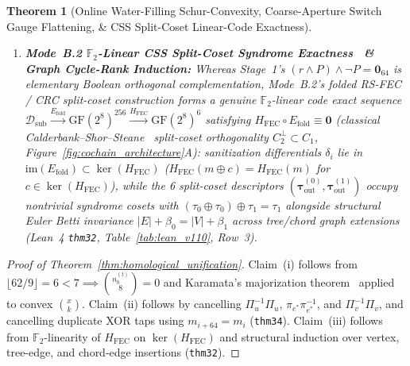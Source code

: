 \documentclass[10pt,twocolumn]{article}
\theoremstyle{spectralthm}
\newtheorem{theorem}{Theorem}[section]
\begin{document}
\begin{theorem}[Online Water-Filling Schur-Convexity, Coarse-Aperture Switch Gauge Flattening, \& CSS Split-Coset Linear-Code Exactness]
\begin{enumerate}
  \item[(iii)] \textbf{Mode~B.2 $\mathbb{F}_2$-Linear CSS Split-Coset Syndrome Exactness~\cite{calderbank1996good} \& Graph Cycle-Rank Induction:} Whereas Stage~1's $(r \wedge P) \wedge \neg P = \mathbf{0}_{64}$ is elementary Boolean orthogonal complementation, Mode~B.2's folded RS-FEC / CRC split-coset construction forms a genuine $\mathbb{F}_2$-linear code exact sequence $\mathcal{D}_{\mathrm{sub}} \xrightarrow{E_{\mathrm{fold}}} \mathrm{GF}(2^8)^{256} \xrightarrow{H_{\mathrm{FEC}}} \mathrm{GF}(2^8)^6$ satisfying $H_{\mathrm{FEC}} \circ E_{\mathrm{fold}} \equiv \mathbf{0}$ (classical Calderbank--Shor--Steane~\cite{calderbank1996good} split-coset orthogonality $C_2^\perp \subset C_1$, Figure~\ref{fig:cochain_architecture}A): sanitization differentials $\delta_i$ lie in $\mathrm{im}(E_{\mathrm{fold}}) \subset \ker(H_{\mathrm{FEC}})$ ($H_{\mathrm{FEC}}(m \oplus c) = H_{\mathrm{FEC}}(m)$ for $c \in \ker(H_{\mathrm{FEC}})$), while the 6 split-coset descriptors $(\boldsymbol{\tau}_{\mathrm{out}}^{(0)}, \boldsymbol{\tau}_{\mathrm{out}}^{(1)})$ occupy nontrivial syndrome cosets with $(\tau_0 \oplus \tau_0) \oplus \tau_1 = \tau_1$ alongside structural Euler Betti invariance $|E| + \beta_0 = |V| + \beta_1$ across tree/chord graph extensions~\cite{tutte1961problem,nashwilliams1961edge,tarjan1983data} (Lean~4 \texttt{thm32}, Table~\ref{tab:lean_v110}, Row~3).
\end{enumerate}
\end{theorem}
\begin{proof}[Proof of Theorem~\ref{thm:homological_unification}]
Claim~(i) follows from $\lfloor 62/9 \rfloor = 6 < 7 \implies \binom{n_b^{(t)}}{8} = 0$ and Karamata's majorization theorem~\cite{marshall2011inequalities} applied to convex $\binom{x}{k}$. Claim~(ii) follows by cancelling $\Pi_u^{-1}\Pi_u$, $\pi_{e^*}\pi_{e^*}^{-1}$, and $\Pi_v^{-1}\Pi_v$, and cancelling duplicate XOR taps using $m_{i+64} = m_i$ (\texttt{thm34}). Claim~(iii) follows from $\mathbb{F}_2$-linearity of $H_{\mathrm{FEC}}$ on $\ker(H_{\mathrm{FEC}})$ and structural induction over vertex, tree-edge, and chord-edge insertions (\texttt{thm32}).
\end{proof}
\end{document}
